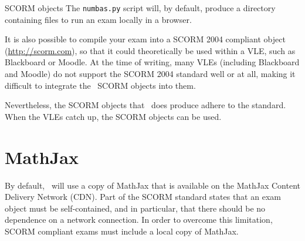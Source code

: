 %
%
%

\begin{chapter}{\label{cha:scorm}SCORM objects}
  The \verb"numbas.py" script will, by default, produce a directory
  containing files to run an exam locally in a browser.
  
  It is also possible to compile your exam into a SCORM 2004 compliant object
  (\url{http://scorm.com}), so that it could theoretically be used within a
  VLE, such as Blackboard or Moodle.  At the time of writing, many VLEs
  (including Blackboard and Moodle) do not support the SCORM 2004 standard well
  or at all, making it difficult to integrate the \numbas\ SCORM objects into
  them.
  
  Nevertheless, the SCORM objects that \numbas\ does produce adhere to the
  standard.  When the VLEs catch up, the SCORM objects can be used.
  
  \section{MathJax}
  By default, \numbas\ will use a copy of MathJax that is available on the
  MathJax Content Delivery Network (CDN).  Part of the SCORM standard states
  that an exam object must be self-contained, and in particular, that there
  should be no dependence on a network connection.  In order to overcome this
  limitation, SCORM compliant exams must include a local copy of MathJax.
  

\end{chapter}

